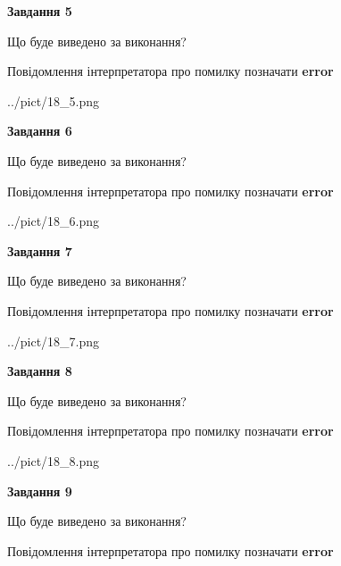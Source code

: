 \documentclass[11pt, ukrainian]{article}
\begin{document}
{\begin {large}
{\begin {center}\textbf{Завдання 5}\end {center}}\par
Що буде виведено за виконання? \par
Повідомлення інтерпретатора про помилку позначати \textbf{error}

\begin{center}
	{../pict/18_5.png}
\end{center}
\newpage

{\begin {center}\textbf{Завдання 6}\end {center}}\par
Що буде виведено за виконання? \par
Повідомлення інтерпретатора про помилку позначати \textbf{error}

\begin{center}
	{../pict/18_6.png}
\end{center}
\newpage

{\begin {center}\textbf{Завдання 7}\end {center}}\par
Що буде виведено за виконання? \par
Повідомлення інтерпретатора про помилку позначати \textbf{error}

\begin{center}
	{../pict/18_7.png}
\end{center}
\newpage

{\begin {center}\textbf{Завдання 8}\end {center}}\par
Що буде виведено за виконання? \par
Повідомлення інтерпретатора про помилку позначати \textbf{error}

\begin{center}
	{../pict/18_8.png}
\end{center}
\newpage

{\begin {center}\textbf{Завдання 9}\end {center}}\par
Що буде виведено за виконання? \par
Повідомлення інтерпретатора про помилку позначати \textbf{error}


\end{large}}
\end{document}
